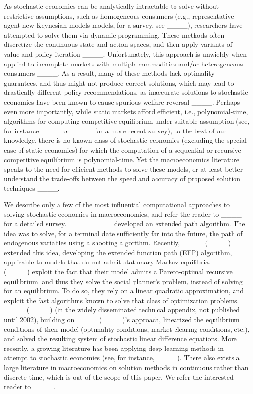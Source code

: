 As stochastic economies can be analytically intractable to solve without restrictive assumptions, such as homogeneous consumers (e.g., representative agent new Keynesian models  models, for a survey, see ____), researchers have attempted to solve them via dynamic programming.
These methods often discretize the continuous state and action spaces, and then apply variants of value and policy iteration ____. 
Unfortunately, this approach is unwieldy when applied to incomplete markets with multiple commodities and/or heterogeneous consumers ____.
As a result, many of these methods lack optimality guarantees, and thus might not produce correct solutions, which may lead to drastically different policy recommendations, as inaccurate solutions to stochastic economies have been known to cause spurious welfare reversal ____.
Perhaps even more importantly, while static markets afford efficient, i.e., polynomial-time, algorithms for computing competitive equilibrium under suitable assumption (see, for instance ____ or ____ for a more recent survey), to the best of our knowledge, there is no known class of stochastic economies (excluding the special case of static economies) for which the computation of a sequential or recursive competitive equilibrium is polynomial-time. 
Yet the macroeconomics literature speaks to the need for efficient methods to solve these models, or at least better understand the trade-offs between the speed and accuracy of proposed solution techniques ____.

We describe only a few of the most influential computational approaches to solving stochastic economies in macroeconomics, and refer the reader to ____ for a detailed survey.
____ ____ developed an extended path algorithm.
The idea was to solve, for a terminal date sufficiently far into the future, the path of endogenous variables using a shooting algorithm. 
Recently, ____ (____) extended this idea, developing the extended function path (EFP) algorithm, applicable to models that do not admit stationary Markov equilibria.
____ (____) exploit the fact that their model admits a Pareto-optimal recursive equilibrium, and thus they solve the social planner's problem, instead of solving for an equilibrium.
To do so, they rely on a linear quadratic approximation, and exploit the fast algorithms known to solve that class of optimization problems. 
____ (____) (in the widely disseminated technical appendix, not published until 2002), building on ____ (____)'s approach, linearized the equilibrium conditions of their model (optimality conditions, market clearing conditions, etc.), and solved the resulting system of stochastic linear difference equations.
More recently, a growing literature has been applying deep learning methods in attempt to stochastic economies (see, for instance, ____).
%
There also exists a large literature in macroeconomics on solution methods in continuous rather than discrete time, which is out of the scope of this paper.
We refer the interested reader to ____.